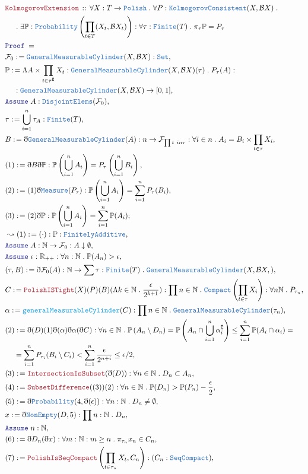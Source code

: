 \documentclass[12pt]{scrartcl}
\newcommand{\TYPE}[1]{\textcolor{NavyBlue}{\mathtt{#1}}}
\newcommand{\FUNC}[1]{\textcolor{Cerulean}{\mathtt{#1}}}
\newcommand{\LOGIC}[1]{\textcolor{Blue}{\mathtt{#1}}}
\newcommand{\THM}[1]{\textcolor{Maroon}{\mathtt{#1}}}
\renewcommand{\.}{\; . \;}
\newcommand{\de}{: \kern 0.1pc =}
\newcommand{\Theorem}[2]{& \THM{#1} \, :: \, #2 \\ & \Proof = \\ }
\newcommand{\NewLine}{\\ & \kern 1pc}
\newcommand{\ForEach}[3]{\forall #1 : #2 \. #3 }
\newcommand{\Reals}{\mathbb{R} }
\newcommand{\Nat}{\mathbb{N} }
\newcommand{\Set}{\TYPE{Set}}
\renewcommand{\c}{\complement}
\newcommand{\Say}[3]{& #1 \de #2 : #3, \\}
\newcommand{\Conclude}[3]{& #1 \de #2 : #3; \\}
\newcommand{\Derive}[3]{& \leadsto #1 \de #2 : #3, \\}
\newcommand{\A}{\LOGIC{Assume} \;}
\newcommand{\Assume}[2]{& \A #1 : #2, \\}
\newcommand{\ByDef}{\eth}
\newcommand{\Proof}{\LOGIC{Proof} \; }
\newcommand{\F}{\mathcal{F}}
\newcommand{\B}{\mathcal{B}}
\begin{document}
\begin{align*}
\Theorem{ KolmogorovExtension }{ 
\ForEach{X}{T \to \TYPE{Polish}}{
\ForEach{P}{ \TYPE{KolmogorovConsistent}(X, \B X ) }{ \NewLine \. 
\exists \mathbb{P} :\TYPE{Probability}\left( \prod_{ t \in T}  (X_t, \B X_t)  \right)
 : 
\ForEach{\tau}{\TYPE{Finite}(T)}{ 
 \pi_\tau \mathbb{P} = P_\tau
}}}}
\Say{ \F_0 }{  \TYPE{GeneralMeasurableCylinder}(X, \B X)  }{\Set}
\Say{ \mathbb{P}}{ \Lambda A \times \prod_{t \in \tau^\c } X_t : \TYPE{GeneralMeasurableCylinder}(X, \B X)(\tau) \. P_\tau(A)  }{ \NewLine :
\TYPE{ GeneralMeasurableCylinder}(X, \B X) \to [0,1] }
\Assume{A}{\TYPE{DisjointElems}(\F_0)}
\Say{\tau}{ \bigcup^n_{i = 1} \tau_A }{ \TYPE{Finite}(T) }
\Say{ B }{ \ByDef\TYPE{GeneralMeasurableCylinder}(A) }{ n \to \F_{\prod t \ in \tau} : \forall i \in n \. A_i = B_i \times \prod_{t \in \tau} X_i }
\Say{  (1)  }{  \ByDef B \ByDef \mathbb{P}}{  \mathbb{P} \left(  \bigcup^n_{i = 1} A_i  \right) 
 = P_\tau \left(  \bigcup^n_{i = 1} B_i \right) }
\Say{ (2)  }{ (1)\ByDef\TYPE{Measure}( P_\tau)   }{ \mathbb{P} \left( \bigcup^n_{i = 1} A_i \right) =  \sum^n_{i = 1} P_\tau ( B_i ) }
\Conclude{ (3) }{ (2)\ByDef \mathbb{P} }{  \mathbb{P} \left( \bigcup^n_{i = 1} A_i \right) = \sum^n_{i = 1} \mathbb{P}(A_i) }
\Derive{  (1)   }{  (\cdot)    }{  \mathbb{P} : \TYPE{FinitelyAdditive}  }
\Assume{ A  }{ \Nat \to \F_0 : A \downarrow \emptyset }
\Assume{ \epsilon }{ \Reals_{++}  : \forall n : \Nat \. \mathbb{P}(A_n) > \epsilon }
\Say{ ( \tau, B ) }{ \ByDef \F_0 (A) }{ \Nat \to \sum \tau : \TYPE{ Finite  }(T) \. \TYPE{GeneralMeasurableCylinder}(X, \B X, )   }
\Say{   C    }{ \THM{PolishISTight}(X)(P)(B)(\Lambda k \in \Nat \. \frac{\epsilon}{2^{k +1}}) }{ \prod n \in \Nat \. \TYPE{Compact}\left( \prod_{t \in \tau} X_i \right)
 : \forall n \Nat \. P_{\tau_n} }
\Say{ \alpha  }{ \FUNC{ generalMeasurableCylinder}( C  ) }{ \prod n \in \Nat \. \TYPE{GeneralMeasurableCylinder}( \tau_n  ) }
\Say{ (2)  }{ \ByDef( D )(1)\ByDef( \alpha )\ByDef{\alpha}(\ByDef C  )  }{
 \forall n \in \Nat \. \mathbb{P} \left(  A_n \setminus D_n  \right)     
 =  \mathbb{P} \left(   A_n \cap \bigcup^n_{ i = 1  } \alpha_i^\c \right)  
 \le \sum^n_{i = 1} \mathbb{P}( A_i  \cap  \alpha_i ) = \NewLine =
\sum^n_{i = 1} P_{ \tau_i}( B_i \setminus C_i  ) <
\sum^n_{i = 1} \frac{ \epsilon }{2^{n + i }} 
\le \epsilon/2 }
\Say{ (3) }{ \THM{IntersectionIsSubset}(\ByDef(D)) }{ \forall n \in \Nat \. D_n \subset A_n  }
\Say{ (4) }{ \THM{SubsetDifference}((3))(2) }{ \forall n \in \Nat \. \mathbb{P}(D_n) > \mathbb{P}(P_n) - \frac{\epsilon}{ 2 }}
\Say{ (5) }{ \ByDef\TYPE{Probability}(4,\ByDef(\epsilon) ) }{  \forall n :  \Nat \. D_n \neq \emptyset  }
\Say{ x }{ \ByDef\TYPE{NonEmpty}(D,5) }{ \prod n : \Nat \. D_n}
\Assume{n}{\Nat}
\Say{(6)}{ \ByDef D_n(  \ByDef x) }{ \forall m : \Nat : m \ge n \. \pi_{\tau_n} x_n \in C_n}
\Say{(7)}{ \THM{PolishIsSeqCompact}\left( \prod_{t \in \tau_n} X_t, C_n \right) }{ ( C_n : \TYPE{SeqCompact}) }
\end{align*}
\end{document}

